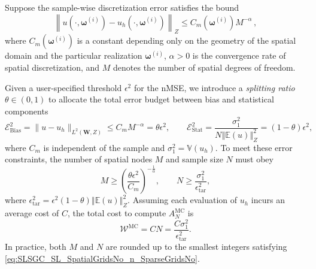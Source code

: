 %
Suppose the sample-wise discretization error satisfies the bound
%
\begin{equation*} \label{eq:Assumption_uhA}
\left\|u\left(\cdot, \boldsymbol\omega^{(i)}\right)-u_h\left(\cdot,\boldsymbol\omega^{(i)}\right)\right\|_Z\leq C_m\left(\boldsymbol\omega^{(i)}\right)M^{-\alpha}\,,
\end{equation*}
%
where $C_m(\boldsymbol\omega^{(i)})$ is a constant depending only on the geometry of the spatial domain and the particular realization $\boldsymbol\omega^{(i)}$, $\alpha>0$ is the convergence rate of spatial discretization, and $M$ denotes the number of spatial degrees of freedom. 

Given a user-specified threshold $\epsilon^2$  for the nMSE, we introduce a {\it splitting ratio} $\theta \in (0,1)$ to allocate the total error budget between bias and statistical components
%
\begin{equation} \label{eq:error-budget}
\mathcal{E}_{\text{Bias}}^2=\|u-u_h\|_{L^2(\boldsymbol W,Z)}\le C_mM^{-\alpha}= \theta\epsilon^2, \quad\quad \mathcal{E}_{\text{Stat}}^2 = \frac{\sigma_1^2}{N\left\Vert\mathbb{E}(u) \right\Vert_{Z}^2}=(1-\theta)\epsilon^2,
\end{equation}
where $C_m$ is independent of the sample and $\sigma_1^2 = \mathbb{V}\left( u_{h}\right)$. To meet these error constraints, the number of spatial nodes $M$ and sample size $N$ must obey
%
\begin{equation}
\label{eq:SLSGC_SL_SpatialGridsNo_n_SparseGridsNo}
M\ge \left(\frac{\theta\epsilon^2}{C_m}\right)^{-\frac 1 {\alpha}},\quad\quad  N \ge  \frac{\sigma_1^2}{\epsilon_{\text{tar}}^2},
\end{equation}
%
where $\epsilon_{\text{tar}}^2 = \epsilon^2(1-\theta)\left\Vert\mathbb{E}(u) \right\Vert_{Z}^2$.
Assuming each evaluation of $u_{h}$ incurs an average cost of $C$, the total cost to compute $A^{\text{MC}}_{N}$ is
%
\[
\mathcal{W}^\text{MC}  = CN=\frac{C\sigma_1^2}{\epsilon_{\text{tar}}^2}.
\]
%
In practice, both $M$ and $N$ are rounded up to the smallest integers satisfying \eqref{eq:SLSGC_SL_SpatialGridsNo_n_SparseGridsNo}.